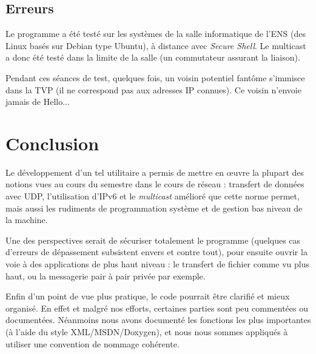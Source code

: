 \documentclass[11pt,a4paper]{article}
\begin{document}
	\subsection{Erreurs}
	
	Le programme a été testé sur les systèmes de la salle informatique de l'ENS (des Linux basés sur Debian type Ubuntu), à distance avec \emph{Secure Shell}.
	Le multicast a donc été testé dans la limite de la salle (un commutateur assurant la liaison).
	
	Pendant ces séances de test, quelques fois, un voisin potentiel fantôme s'immisce dans la TVP (il ne correspond pas aux adresses IP connues). Ce voisin n'envoie
	jamais de Hello...
	
\section{Conclusion}
	
	Le développement d'un tel utilitaire a permis de mettre en œuvre la plupart des notions vues au cours du semestre dans le cours
	de réseau : transfert de données avec UDP, l'utilisation d'IPv6 et le \emph{multicast} amélioré que cette norme permet, mais aussi les rudiments
	 de programmation système et de gestion bas niveau de la machine.
	
	Une des perspectives serait de sécuriser totalement le programme (quelques cas d'erreurs de dépassement subsistent envers et contre tout), pour ensuite
	ouvrir la voie à des applications de plus haut niveau : le transfert de fichier comme vu plus haut, ou la messagerie pair à pair privée par exemple.
	
	\medskip
	
	Enfin d'un point de vue plus pratique, le code pourrait être clarifié et mieux organisé. En effet et malgré nos efforts, certaines parties sont peu commentées
	ou documentées. Néanmoins nous avons documenté les fonctions les plus importantes (à l'aide du style XML/MSDN/Doxygen), et nous nous sommes appliqués à
	utiliser une convention de nommage cohérente.
\end{document}
